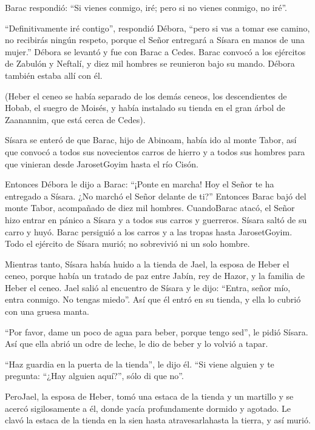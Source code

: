  Barac respondió: ``Si vienes conmigo, iré; pero si no
vienes conmigo, no iré''.

 ``Definitivamente iré contigo'', respondió Débora, ``pero
si vas a tomar ese camino, no recibirás ningún respeto, porque el Señor
entregará a Sísara en manos de una mujer.'' Débora se levantó y fue con
Barac a Cedes.  Barac convocó a los ejércitos de Zabulón y
Neftalí, y diez mil hombres se reunieron bajo su mando. Débora también
estaba allí con él.

 (Heber el ceneo se había separado de los demás ceneos, los
descendientes de Hobab, el suegro de Moisés, y había instalado su tienda
en el gran árbol de Zaanannim, que está cerca de Cedes).

 Sísara se enteró de que Barac, hijo de Abinoam, había ido
al monte Tabor,  así que convocó a todos sus novecientos
carros de hierro y a todos sus hombres para que vinieran desde
JarosetGoyim hasta el río Cisón.

 Entonces Débora le dijo a Barac: ``¡Ponte en marcha! Hoy
el Señor te ha entregado a Sísara. ¿No marchó el Señor delante de ti?''
Entonces Barac bajó del monte Tabor, acompañado de diez mil hombres.
 CuandoBarac atacó, el Señor hizo entrar en pánico a Sísara
y a todos sus carros y guerreros. Sísara saltó de su carro y huyó.
 Barac persiguió a los carros y a las tropas hasta
JarosetGoyim. Todo el ejército de Sísara murió; no sobrevivió ni un solo
hombre.

 Mientras tanto, Sísara había huido a la tienda de Jael, la
esposa de Heber el ceneo, porque había un tratado de paz entre Jabín,
rey de Hazor, y la familia de Heber el ceneo.  Jael salió
al encuentro de Sísara y le dijo: ``Entra, señor mío, entra conmigo. No
tengas miedo''. Así que él entró en su tienda, y ella lo cubrió con una
gruesa manta.

 ``Por favor, dame un poco de agua para beber, porque tengo
sed'', le pidió Sísara. Así que ella abrió un odre de leche, le dio de
beber y lo volvió a tapar.

 ``Haz guardia en la puerta de la tienda'', le dijo él.
``Si viene alguien y te pregunta: ``¿Hay alguien aquí?'', sólo di que
no''.

 PeroJael, la esposa de Heber, tomó una estaca de la tienda
y un martillo y se acercó sigilosamente a él, donde yacía profundamente
dormido y agotado. Le clavó la estaca de la tienda en la sien hasta
atravesarlahasta la tierra, y así murió.

